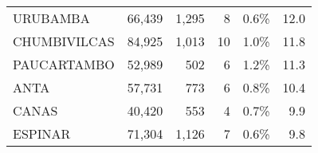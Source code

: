 \begin{tabular}{lrrrrr}
	\cellcolor[HTML]{FFFFC7}URUBAMBA      & 66,439                                                         & 1,295                                                                           & 8                                                              & 0.6\%                                                                  & 12.0                                                                                                                               \\
	\cellcolor[HTML]{FFFFC7}CHUMBIVILCAS  & 84,925                                                         & 1,013                                                                           & 10                                                             & 1.0\%                                                                  & 11.8                                                                                                                               \\
	\cellcolor[HTML]{FFFFC7}PAUCARTAMBO   & 52,989                                                         & 502                                                                             & 6                                                              & 1.2\%                                                                  & 11.3                                                                                                                               \\
	\cellcolor[HTML]{FFFFC7}ANTA          & 57,731                                                         & 773                                                                             & 6                                                              & 0.8\%                                                                  & 10.4                                                                                                                               \\
	\cellcolor[HTML]{FFFFC7}CANAS         & 40,420                                                         & 553                                                                             & 4                                                              & 0.7\%                                                                  & 9.9                                                                                                                                \\
	\cellcolor[HTML]{FFFFC7}ESPINAR       & 71,304                                                         & 1,126                                                                           & 7                                                              & 0.6\%                                                                  & 9.8                                                                                                                                \\

\end{tabular}
